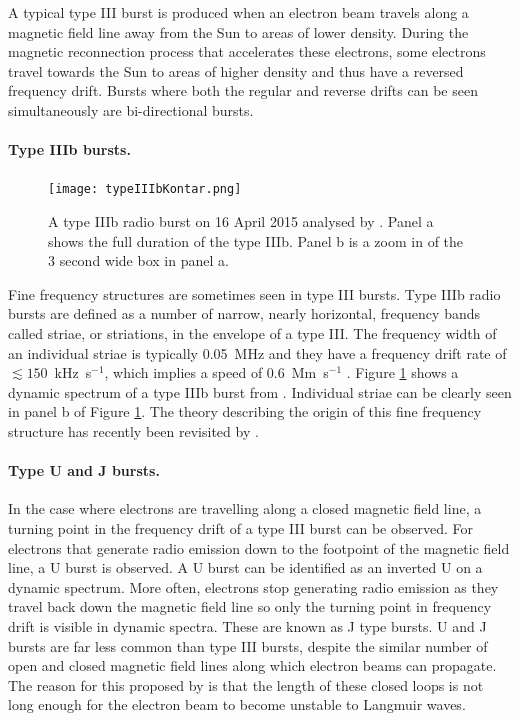 A typical type III burst is produced when an electron beam travels along a magnetic field line away from the Sun to areas of lower density. During the magnetic reconnection process that accelerates these electrons, some electrons travel towards the Sun to areas of higher density and thus have a reversed frequency drift. Bursts where both the regular and reverse drifts can be seen simultaneously are bi-directional bursts.

\paragraph{Type IIIb bursts.}

\begin{figure}[ht]
\centering
\texttt{[image: typeIIIbKontar.png]}
\caption[The type IIIb radio burst from \cite{Kontar2017}.]{A type IIIb radio burst on 16 April 2015 analysed by \cite{Kontar2017}. Panel a shows the full duration of the type IIIb. Panel b is a zoom in of the 3 second wide box in panel a.}
\label{fig:typeIIIbKontar}
\end{figure}

Fine frequency structures are sometimes seen in type III bursts. Type IIIb radio bursts are defined as a number of narrow, nearly horizontal, frequency bands called striae, or striations, in the envelope of a type III. The frequency width of an individual striae is typically 0.05~MHz \citep{McLean1985} and they have a frequency drift rate of $\lesssim 150$~kHz~s$^{-1}$, which implies a speed of 0.6~Mm~s$^{-1}$ \cite{Sharykin2018}. Figure \ref{fig:typeIIIbKontar} shows a dynamic spectrum of a type IIIb burst from \cite{Kontar2017}. Individual striae can be clearly seen in panel b of Figure \ref{fig:typeIIIbKontar}. The theory describing the origin of this fine frequency structure has recently been revisited by \cite{Reid2021}.

\paragraph{Type U and J bursts.}

In the case where electrons are travelling along a closed magnetic field line, a turning point in the frequency drift of a type III burst can be observed. For electrons that generate radio emission down to the footpoint of the magnetic field line, a U burst is observed. A U burst can be identified as an inverted U on a dynamic spectrum. More often, electrons stop generating radio emission as they travel back down the magnetic field line so only the turning point in frequency drift is visible in dynamic spectra. These are known as J type bursts. U and J bursts are far less common than type III bursts, despite the similar number of open and closed magnetic field lines along which electron beams can propagate. The reason for this proposed by \cite{Reid2017} is that the length of these closed loops is not long enough for the electron beam to become unstable to Langmuir waves.

